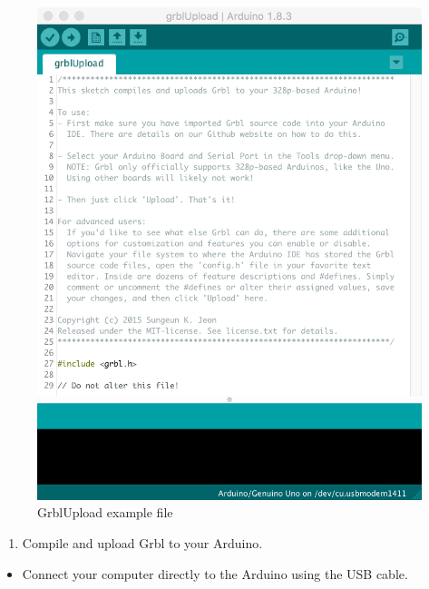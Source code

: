 \documentclass[]{book}
\providecommand{\tightlist}{%
  \setlength{\itemsep}{0pt}\setlength{\parskip}{0pt}}
\theoremstyle{definition}
\theoremstyle{definition}
\theoremstyle{remark}
\begin{document}
\begin{figure}

{\centering \includegraphics[width=0.75\linewidth]{images/grbl_upload_file} 

}

\caption{GrblUpload example file}\label{fig:grblUploadFile}
\end{figure}

\begin{enumerate}
\def\labelenumi{\arabic{enumi}.}
\setcounter{enumi}{4}
\tightlist
\item
  Compile and upload Grbl to your Arduino.
\end{enumerate}

\begin{itemize}
\tightlist
\item
  Connect your computer directly to the Arduino using the USB cable.
\end{itemize}
\end{document}
